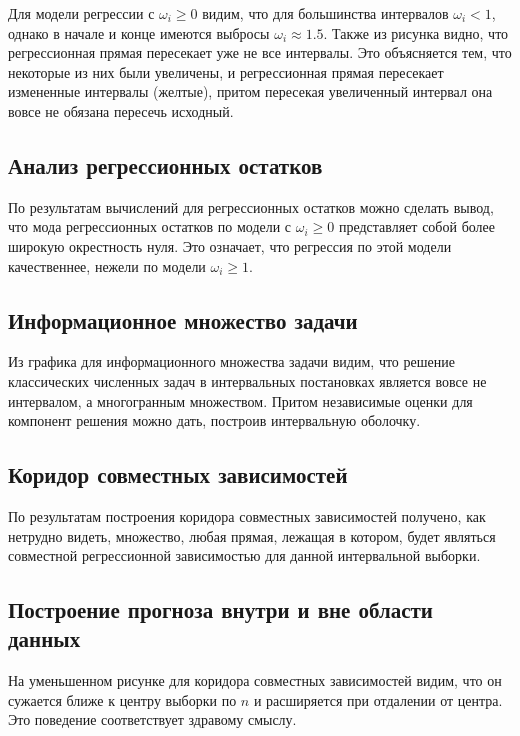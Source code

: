 \documentclass[12pt]{article}
\begin{document}
	Для модели регрессии с $\omega_i \geq 0$ видим, что для большинства интервалов $\omega_i < 1$, однако в начале и конце имеются выбросы $\omega_i \approx 1.5$. Также из рисунка видно, что регрессионная прямая пересекает уже не все интервалы. Это объясняется тем, что некоторые из них были увеличены, и регрессионная прямая пересекает измененные интервалы (желтые), притом пересекая увеличенный интервал она вовсе не обязана пересечь исходный.
	
	\subsection{Анализ регрессионных остатков}
	
	По результатам вычислений для регрессионных остатков можно сделать вывод, что мода регрессионных остатков по модели с $\omega_i \geq 0$ представляет собой более широкую окрестность нуля. Это означает, что регрессия по этой модели качественнее, нежели по модели $\omega_i \geq 1$.
	
	\subsection{Информационное множество задачи}
	
	Из графика для информационного множества задачи видим, что решение классических численных задач в интервальных постановках является вовсе не интервалом, а многогранным множеством. Притом независимые оценки для компонент решения можно дать, построив интервальную оболочку.
	
	\subsection{Коридор совместных зависимостей}
	
	По результатам построения коридора совместных зависимостей получено, как нетрудно видеть, множество, любая прямая, лежащая в котором, будет являться совместной регрессионной зависимостью для данной интервальной выборки.
	
	\subsection{Построение прогноза внутри и вне области данных}
	
	На уменьшенном рисунке для коридора совместных зависимостей видим, что он сужается ближе к центру выборки по $n$ и расширяется при отдалении от центра. Это поведение соответствует здравому смыслу.
	
\end{document}
